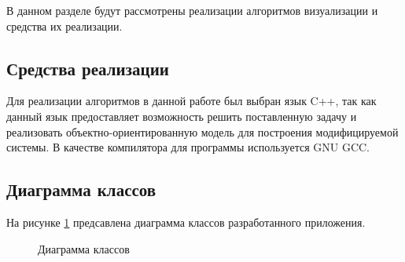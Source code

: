 В данном разделе будут рассмотрены реализации алгоритмов визуализации и
средства их реализации.

\subsection{Средства реализации}
Для реализации алгоритмов в данной работе был выбран язык C++, так как
данный язык предоставляет возможность решить поставленную задачу и реализовать
объектно-ориентированную модель для построения модифицируемой системы.
В качестве компилятора для программы используется GNU GCC.

\subsection{Диаграмма классов}
На рисунке \ref{fig:uml_diag} предсавлена диаграмма классов разработанного
приложения.

\clearpage

\begin{figure}
    \centering
    \def\svgwidth{\textheight}
    
    \caption{Диаграмма классов}
    \label{fig:uml_diag}
\end{figure}

\clearpage

